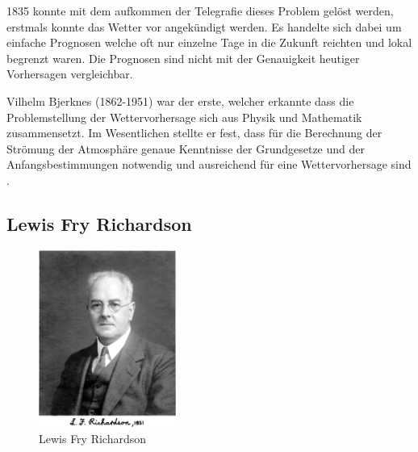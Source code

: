 \begin{refsection}
1835 konnte mit dem aufkommen der Telegrafie dieses Problem gelöst werden, erstmals konnte das Wetter vor angekündigt werden. Es handelte sich dabei um einfache Prognosen welche oft nur einzelne Tage in die Zukunft reichten und lokal begrenzt waren. Die Prognosen sind nicht mit der Genauigkeit heutiger Vorhersagen vergleichbar.

Vilhelm Bjerknes (1862-1951) war der erste, welcher erkannte dass die Problemstellung der Wettervorhersage sich aus Physik und Mathematik zusammensetzt. Im Wesentlichen stellte er fest, dass für die Berechnung der Strömung der Atmosphäre genaue Kenntnisse der Grundgesetze und der Anfangsbestimmungen notwendig und ausreichend für eine Wettervorhersage sind \cite{klima:stocker} \cite{klima:dwd}.

\subsection{Lewis Fry Richardson
\label{klima:subsection:richardson}}

\begin{figure}
\centering
\includegraphics[width=0.4\textwidth]{klima/richardson.jpg}
\caption{Lewis Fry Richardson \cite{klima:biography}
\label{klima:geschichte:richardson}}
\end{figure}


\end{refsection}

